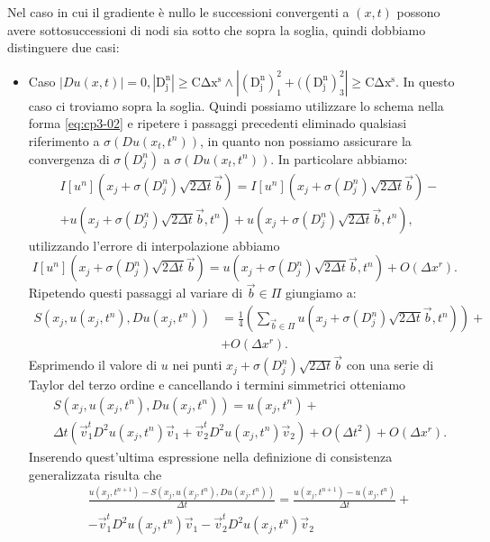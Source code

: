 Nel caso in cui il gradiente è nullo le successioni convergenti a $(x,t)$ possono avere sottosuccessioni di nodi sia sotto che sopra la soglia, quindi dobbiamo distinguere due casi:
\begin{itemize}
  \item \textsf{Caso} $|Du(x,t)|=0,\mathrm{|D_j^n|\ge C\Delta x^s\land|(D_j^n)_1^2+((D_j^n)_3^2|\ge C\Delta x^s}$. In questo caso ci troviamo sopra la soglia. Quindi possiamo utilizzare lo schema nella forma \eqref{eq:cp3-02} e ripetere i passaggi precedenti eliminado qualsiasi riferimento a $\sigma(Du(x_t,t^n))$, in quanto non possiamo assicurare la convergenza di $\sigma(D_j^n)$ a $\sigma(Du(x_t,t^n))$. In particolare abbiamo:
\[
  \begin{split}
    & I[u^n](x_j+\sigma(D_j^n)\sqrt{2\Delta t}\vec{b}) = I[u^n](x_j+\sigma(D_j^n)\sqrt{2\Delta t}\vec{b}) - \\
    & +u(x_j+\sigma(D_j^n)\sqrt{2\Delta t}\vec{b},t^n) + u(x_j+\sigma(D_j^n)\sqrt{2\Delta t}\vec{b},t^n),
  \end{split}
\]
utilizzando l'errore di interpolazione abbiamo
\[
I[u^n](x_j+\sigma(D_j^n)\sqrt{2\Delta t}\vec{b})=u(x_j+\sigma(D_j^n)\sqrt{2\Delta t}\vec{b},t^n) + O(\Delta x^r).
\]
Ripetendo questi passaggi al variare di $\vec{b}\in\Pi$ giungiamo a:
\[
 \begin{split}
 S(x_j,u(x_j,t^n),Du(x_j,t^n))&=\frac{1}{4}\left(\sum_{\vec{b}\in\Pi}u(x_j+\sigma(D_j^n)\sqrt{2\Delta t}\vec{b},t^n)\right)+\\
  &+ O(\Delta x^r).
 \end{split}
\]
Esprimendo il valore di $u$ nei punti $x_j+\sigma(D_j^n)\sqrt{2\Delta t}\vec{b}$ con una serie di Taylor del terzo ordine e cancellando i termini simmetrici otteniamo
\begin{equation}
  \label{eq:cp3-11}
  \begin{split}
    &S(x_j,u(x_j,t^n),Du(x_j,t^n)) = u(x_j,t^n) + \\
    &\Delta t\left(\vec{v}_1^tD^2u(x_j,t^n)\vec{v}_1 + \vec{v}_2^tD^2u(x_j,t^n)\vec{v}_2\right) + O(\Delta t^2) + O(\Delta x^r).
   \end{split}
\end{equation}
Inserendo quest'ultima espressione nella definizione di consistenza generalizzata risulta che
\[
\begin{split}
  &\frac{u(x_j,t^{n+1})-S(x_j,u(x_j,t^n),Du(x_j,t^n))}{\Delta t}= \frac{u(x_j,t^{n+1})-u(x_j,t^n)}{\Delta t} + \\
  &  -\vec{v}_1^tD^2u(x_j,t^n)\vec{v}_1 -\vec{v}_2^tD^2u(x_j,t^n)\vec{v}_2  

\end{split}\]
\end{itemize}
